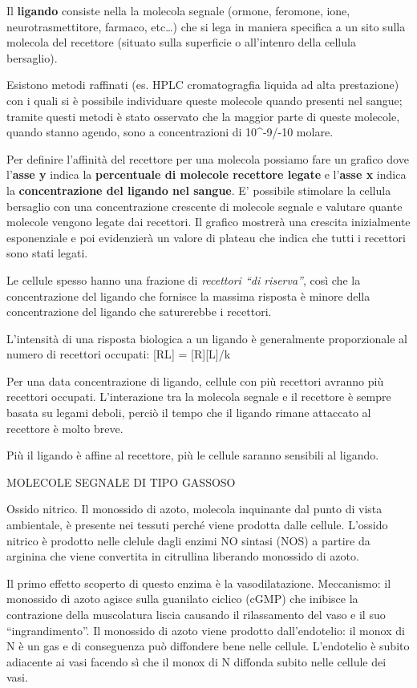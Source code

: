 \documentclass[]{article}
\begin{document}
Il \textbf{ligando} consiste nella la molecola segnale (ormone,
feromone, ione, neurotrasmettitore, farmaco, etc\ldots{}) che si lega in
maniera specifica a un sito sulla molecola del recettore (situato sulla
superficie o all'intenro della cellula bersaglio).

Esistono metodi raffinati (es. HPLC cromatogragfia liquida ad alta
prestazione) con i quali si è possibile individuare queste molecole
quando presenti nel sangue; tramite questi metodi è stato osservato che
la maggior parte di queste molecole, quando stanno agendo, sono a
concentrazioni di 10\^{}-9/-10 molare.

Per definire l'affinità del recettore per una molecola possiamo fare un
grafico dove l'\textbf{asse y} indica la \textbf{percentuale di molecole
recettore legate} e l'\textbf{asse x} indica la \textbf{concentrazione
del ligando nel sangue}. E' possibile stimolare la cellula bersaglio con
una concentrazione crescente di molecole segnale e valutare quante
molecole vengono legate dai recettori. Il grafico mostrerà una crescita
inizialmente esponenziale e poi evidenzierà un valore di plateau che
indica che tutti i recettori sono stati legati.

Le cellule spesso hanno una frazione di \emph{recettori ``di riserva''},
così che la concentrazione del ligando che fornisce la massima risposta
è minore della concentrazione del ligando che saturerebbe i recettori.

L'intensità di una risposta biologica a un ligando è generalmente
proporzionale al numero di recettori occupati: {[}RL{]} =
{[}R{]}{[}L{]}/k

Per una data concentrazione di ligando, cellule con più recettori
avranno più recettori occupati. L'interazione tra la molecola segnale e
il recettore è sempre basata su legami deboli, perciò il tempo che il
ligando rimane attaccato al recettore è molto breve.

Più il ligando è affine al recettore, più le cellule saranno sensibili
al ligando.

MOLECOLE SEGNALE DI TIPO GASSOSO

Ossido nitrico. Il monossido di azoto, molecola inquinante dal punto di
vista ambientale, è presente nei tessuti perché viene prodotta dalle
cellule. L'ossido nitrico è prodotto nelle clelule dagli enzimi NO
sintasi (NOS) a partire da arginina che viene convertita in citrullina
liberando monossido di azoto.

Il primo effetto scoperto di questo enzima è la vasodilatazione.
Meccanismo: il monossido di azoto agisce sulla guanilato ciclico (cGMP)
che inibisce la contrazione della muscolatura liscia causando il
rilassamento del vaso e il suo ``ingrandimento''. Il monossido di azoto
viene prodotto dall'endotelio: il monox di N è un gas e di conseguenza
può diffondere bene nelle cellule. L'endotelio è subito adiacente ai
vasi facendo sì che il monox di N diffonda subito nelle cellule dei
vasi.
\end{document}
